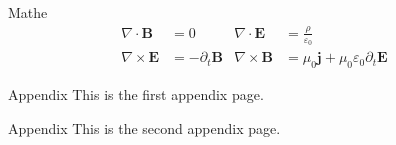 \documentclass[aspectratio=1610, 9pt]{beamer}
\begin{document}
\begin{frame}{Mathe}
  \begin{align*}
    \nabla \cdot \symbf{B} &= 0 &
    \nabla \cdot \symbf{E} &= \frac{ρ}{ε_0} \\
    \nabla \times \symbf{E} &= -\partial_t \symbf{B} &
    \nabla \times \symbf{B} &= μ_0 \symbf{j} + μ_0 ε_0 \partial_t \symbf{E} &
  \end{align*}
\end{frame}

\appendix
\appendixfootline

\begin{frame}{Appendix}
  This is the first appendix page.
\end{frame}

\begin{frame}{Appendix}
  This is the second appendix page.
\end{frame}
\end{document}
